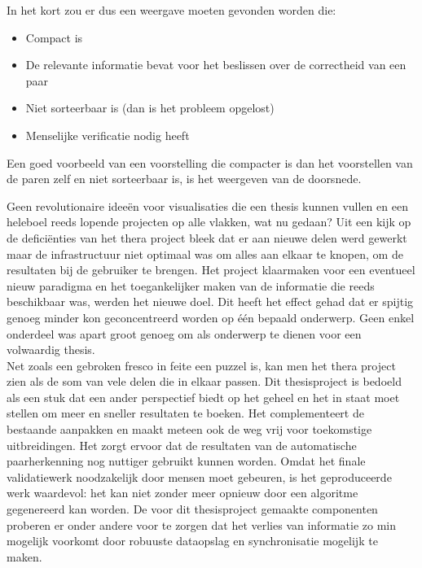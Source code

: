 In het kort zou er dus een weergave moeten gevonden worden die:

\begin{itemize}
	\item Compact is
	\item De relevante informatie bevat voor het beslissen over de correctheid van een paar
	\item Niet sorteerbaar is (dan is het probleem opgelost)
	\item Menselijke verificatie nodig heeft
\end{itemize}

Een goed voorbeeld van een voorstelling die compacter is dan het voorstellen van de paren zelf en niet sorteerbaar is, is het weergeven van de doorsnede. 

Geen revolutionaire idee\"en voor visualisaties die een thesis kunnen vullen en een heleboel reeds lopende projecten op alle vlakken, wat nu gedaan? Uit een kijk op de defici\"enties van het thera project bleek dat er aan nieuwe delen werd gewerkt maar de infrastructuur niet optimaal was om alles aan elkaar te knopen, om de resultaten bij de gebruiker te brengen. Het project klaarmaken voor een eventueel nieuw paradigma en het toegankelijker maken van de informatie die reeds beschikbaar was, werden het nieuwe doel. Dit heeft het effect gehad dat er spijtig genoeg minder kon geconcentreerd worden op \'e\'en bepaald onderwerp. Geen enkel onderdeel was apart groot genoeg om als onderwerp te dienen voor een volwaardig thesis.\\

Net zoals een gebroken fresco in feite een puzzel is, kan men het thera project zien als de som van vele delen die in elkaar passen. Dit thesisproject is bedoeld als een stuk dat een ander perspectief biedt op het geheel en het in staat moet stellen om meer en sneller resultaten te boeken. Het complementeert de bestaande aanpakken en maakt meteen ook de weg vrij voor toekomstige uitbreidingen. Het zorgt ervoor dat de resultaten van de automatische paarherkenning nog nuttiger gebruikt kunnen worden. Omdat het finale validatiewerk noodzakelijk door mensen moet gebeuren, is het geproduceerde werk waardevol: het kan niet zonder meer opnieuw door een algoritme gegenereerd kan worden. De voor dit thesisproject gemaakte componenten proberen er onder andere voor te zorgen dat het verlies van informatie zo min mogelijk voorkomt door robuuste dataopslag en synchronisatie mogelijk te maken.\\

